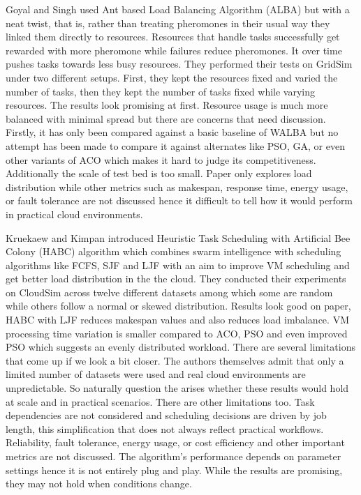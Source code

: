 \documentclass[pdflatex,sn-mathphys-num]{sn-jnl}%
\begin{document}
Goyal and Singh \cite{AntColonyOptimization} used Ant based Load Balancing Algorithm (ALBA) but with a neat twist, that is, rather than treating pheromones in their usual way they linked them directly to resources. Resources that handle tasks successfully get rewarded with more pheromone while failures reduce pheromones. It over time pushes tasks towards less busy resources. They performed their tests on GridSim under two different setups. First, they kept the resources fixed and varied the number of tasks, then they kept the number of tasks fixed while varying resources. The results look promising at first. Resource usage is much more balanced with minimal spread but there are concerns that need discussion. Firstly, it has only been compared against a basic baseline of WALBA but no attempt has been made to compare it against alternates like PSO, GA, or even other variants of ACO which makes it hard to judge its competitiveness. Additionally the scale of test bed is too small. Paper only explores load distribution while other metrics such as makespan, response time, energy usage, or fault tolerance are not discussed hence it difficult to tell how it would perform in practical cloud environments.

Kruekaew and Kimpan \cite{bib12} introduced Heuristic Task Scheduling with Artificial
Bee Colony (HABC) algorithm which combines swarm intelligence with scheduling algorithms like FCFS, SJF and LJF with an aim to improve VM scheduling and get better load distribution in the the cloud. They conducted their experiments on CloudSim across twelve different datasets among which some are random while others follow a normal or skewed distribution. Results look good on paper,  HABC with LJF reduces makespan values and also reduces load imbalance. VM processing time variation is smaller compared to ACO, PSO and even improved PSO which suggests an evenly distributed workload. There are several limitations that come up if we look a bit closer. The authors themselves admit that only a limited number of datasets were used and real cloud environments are unpredictable. So naturally question the arises whether these results would hold at scale and in practical scenarios. There are other limitations too. Task dependencies are not considered and scheduling decisions are driven by job length, this simplification that does not always reflect practical workflows. Reliability, fault tolerance, energy usage, or cost efficiency and other important metrics are not discussed. The algorithm’s performance depends on parameter settings hence it is not entirely plug and play. While the results are promising, they may not hold when conditions change.
\end{document}

